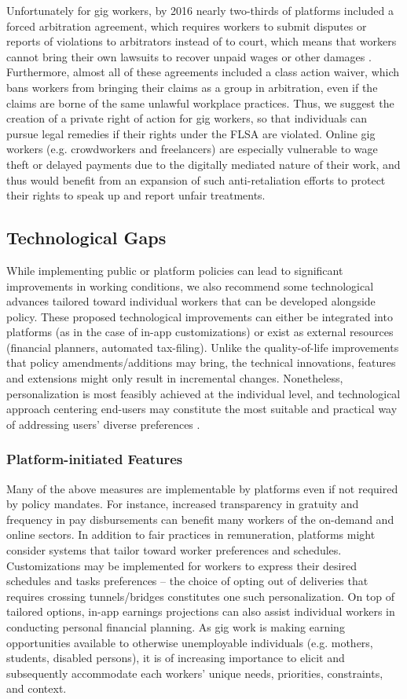 Unfortunately for gig workers, by 2016 nearly two-thirds of platforms included a forced arbitration agreement, which requires workers to submit disputes or reports of violations to arbitrators instead of to court, which means that workers cannot bring their own lawsuits to recover unpaid wages or other damages \cite{noauthor_2021-ms}. Furthermore, almost all of these agreements included a class action waiver, which bans workers from bringing their claims as a group in arbitration, even if the claims are borne of the same unlawful workplace practices. Thus, we suggest the creation of a private right of action for gig workers, so that individuals can pursue legal remedies if their rights under the FLSA are violated. Online gig workers (e.g. crowdworkers and freelancers) are especially vulnerable to wage theft or delayed payments due to the digitally mediated nature of their work, and thus would benefit from an expansion of such anti-retaliation efforts to protect their rights to speak up and report unfair treatments.

\subsection{Technological Gaps}
While implementing public or platform policies can lead to significant improvements in working conditions, we also recommend some technological advances tailored toward individual workers that can be developed alongside policy. These proposed technological improvements can either be integrated into platforms (as in the case of in-app customizations) or exist as external resources (financial planners, automated tax-filing). Unlike the quality-of-life improvements that policy amendments/additions may bring, the technical innovations, features and extensions might only result in incremental changes. Nonetheless, personalization is most feasibly achieved at the individual level, and technological approach centering end-users may constitute the most suitable and practical way of addressing users' diverse preferences \cite{Li2022-hd}.

\subsubsection{Platform-initiated Features}
Many of the above measures are implementable by platforms even if not required by policy mandates. For instance, increased transparency in gratuity and frequency in pay disbursements can benefit many workers of the on-demand and online sectors. In addition to fair practices in remuneration, platforms might consider systems that tailor toward worker preferences and schedules. Customizations may be implemented for workers to express their desired schedules and tasks preferences – the choice of opting out of deliveries that requires crossing tunnels/bridges constitutes one such personalization. On top of tailored options, in-app earnings projections can also assist individual workers in conducting personal financial planning. As gig work is making earning opportunities available to otherwise unemployable individuals (e.g. mothers, students, disabled persons), it is of increasing importance to elicit and subsequently accommodate each workers' unique needs, priorities, constraints, and context. 

